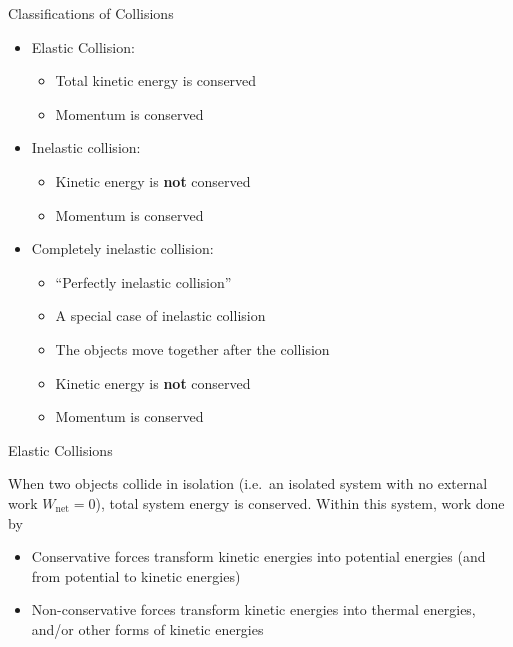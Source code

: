 \documentclass[12pt,compress,aspectratio=169]{beamer}
\begin{document}
\begin{frame}{Classifications of Collisions}
  \begin{itemize}
  \item Elastic Collision:
    \begin{itemize}
    \item Total kinetic energy is conserved
    \item<alert@1> Momentum is conserved
    \end{itemize}
  \item Inelastic collision:
    \begin{itemize}
    \item Kinetic energy is \textbf{not} conserved
    \item<alert@1> Momentum is conserved
    \end{itemize}
  \item Completely inelastic collision:
    \begin{itemize}
    \item ``Perfectly inelastic collision''
    \item A special case of inelastic collision
    \item The objects move together after the collision
    \item Kinetic energy is \textbf{not} conserved
    \item<alert@1> Momentum is conserved
    \end{itemize}
  \end{itemize}
\end{frame}



\begin{frame}{Elastic Collisions}
  
  When two objects collide in isolation (i.e.\ an isolated system with no
  external work $W_\text{net}=0$), total system energy is conserved. Within
  this system, work done by
  \begin{itemize}
  \item Conservative forces transform kinetic energies into potential energies
    (and from potential to kinetic energies)
  \item Non-conservative forces transform kinetic energies into thermal
    energies, and/or other forms of kinetic energies
  \end{itemize}
\end{frame}
\end{document}
